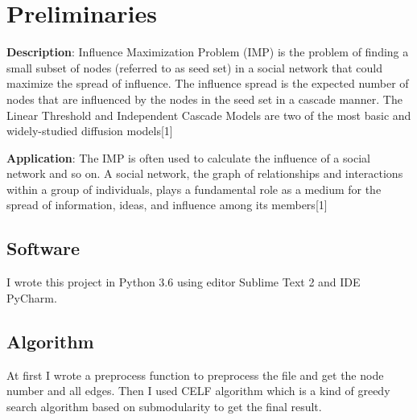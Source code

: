 \documentclass[conference,compsoc]{IEEEtran}
\begin{document}
\maketitle







%
\IEEEpeerreviewmaketitle



\section{Preliminaries}
\textbf{Description}: Influence Maximization Problem (IMP) is the problem of finding a
small subset of nodes (referred to as seed set) in a social network that
could maximize the spread of influence. The influence spread is the expected number of nodes that are
influenced by the nodes in the seed set in a cascade manner. The Linear Threshold and Independent Cascade Models are two of the most basic and widely-studied diffusion models[1]\par
\textbf{Application}: The IMP is often used to calculate the influence of a social network and so on. A social network, the graph of relationships and interactions
within a group of individuals, plays a fundamental role as a
medium for the spread of information, ideas, and influence among
its members[1]

\subsection{Software}
I wrote this project in Python 3.6 using editor Sublime Text 2 and IDE PyCharm.

\subsection{Algorithm}
At first I wrote a preprocess function to preprocess the file and get the node number and all edges. Then I used CELF algorithm which is a kind of greedy search algorithm based on submodularity to get the final result.
\end{document}
